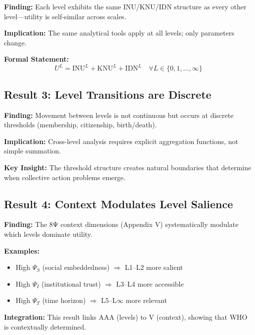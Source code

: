 \begin{tcolorbox}[colback=green!5!white, colframe=green!75!black]
\textbf{Finding:} Each level exhibits the same INU/KNU/IDN structure as every 
other level---utility is self-similar across scales.

\textbf{Implication:} The same analytical tools apply at all levels; only 
parameters change.

\textbf{Formal Statement:}
\[
U^L = \text{INU}^L + \text{KNU}^L + \text{IDN}^L \quad \forall L \in \{0, 1, ..., \infty\}
\]
\end{tcolorbox}

\subsection{Result 3: Level Transitions are Discrete}

\begin{tcolorbox}[colback=green!5!white, colframe=green!75!black]
\textbf{Finding:} Movement between levels is not continuous but occurs at 
discrete thresholds (membership, citizenship, birth/death).

\textbf{Implication:} Cross-level analysis requires explicit aggregation 
functions, not simple summation.

\textbf{Key Insight:} The threshold structure creates natural boundaries 
that determine when collective action problems emerge.
\end{tcolorbox}

\subsection{Result 4: Context Modulates Level Salience}

\begin{tcolorbox}[colback=green!5!white, colframe=green!75!black]
\textbf{Finding:} The 8Ψ context dimensions (Appendix V) systematically 
modulate which levels dominate utility.

\textbf{Examples:}
\begin{itemize}[nosep]
    \item High $\Psi_S$ (social embeddedness) $\Rightarrow$ L1--L2 more salient
    \item High $\Psi_I$ (institutional trust) $\Rightarrow$ L3--L4 more accessible
    \item High $\Psi_T$ (time horizon) $\Rightarrow$ L5--L$\infty$ more relevant
\end{itemize}

\textbf{Integration:} This result links AAA (levels) to V (context), showing 
that WHO is contextually determined.
\end{tcolorbox}



